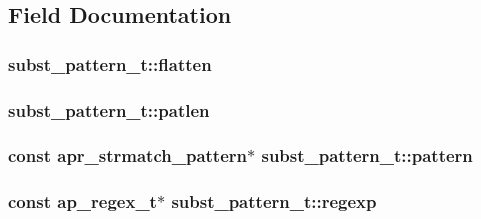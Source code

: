 \subsection{Field Documentation}
\subsubsection[{\texorpdfstring{flatten}{flatten}}]{ subst\+\_\+pattern\+\_\+t\+::flatten}\hypertarget{structsubst__pattern__t_a2e82f89a2de0f9327f837e0386ba846c}{}\label{structsubst__pattern__t_a2e82f89a2de0f9327f837e0386ba846c}
\subsubsection[{\texorpdfstring{patlen}{patlen}}]{ subst\+\_\+pattern\+\_\+t\+::patlen}\hypertarget{structsubst__pattern__t_a0b63d4aafdd1339694d61d43937cb6ea}{}\label{structsubst__pattern__t_a0b63d4aafdd1339694d61d43937cb6ea}
\subsubsection[{\texorpdfstring{pattern}{pattern}}]{\setlength{\rightskip}{0pt plus 5cm}const {\bf apr\+\_\+strmatch\+\_\+pattern}$\ast$ subst\+\_\+pattern\+\_\+t\+::pattern}\hypertarget{structsubst__pattern__t_a5c8dac2a6ff42acdfcd3f73450251d42}{}\label{structsubst__pattern__t_a5c8dac2a6ff42acdfcd3f73450251d42}
\subsubsection[{\texorpdfstring{regexp}{regexp}}]{\setlength{\rightskip}{0pt plus 5cm}const {\bf ap\+\_\+regex\+\_\+t}$\ast$ subst\+\_\+pattern\+\_\+t\+::regexp}\hypertarget{structsubst__pattern__t_a0dda144f8006dce7d47d545377491c4d}{}\label{structsubst__pattern__t_a0dda144f8006dce7d47d545377491c4d}
